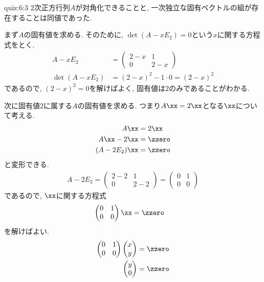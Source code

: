 \begin{answerof}{quiz:6:3}
  $2$次正方行列$A$が対角化できることと,
  一次独立な固有ベクトルの組が存在することは同値であった.

  まず$A$の固有値を求める.
  そのために, $\det(A-xE_2)=0$という$x$に関する方程式をとく.
  \begin{align*}
    A-xE_2&=\begin{pmatrix}2-x&1\\0&2-x\end{pmatrix}\\
    \det(A-xE_2)&=(2-x)^2-1\cdot 0=(2-x)^2
  \end{align*}
  であるので, $(2-x)^2=0$を解けばよく,
  固有値は$2$のみであることがわかる.

  次に固有値$2$に属する$A$の固有値を求める.
  つまり$A\xx=2\xx$となる$\xx$について考える.
  \begin{align*}
    A\xx&=2\xx\\
    A\xx-2\xx&=\zzero \\
    (A-2E_2)\xx&=\zzero
  \end{align*}
  と変形できる.
  \begin{align*}
    A-2E_2=\begin{pmatrix}2-2&1\\0&2-2\end{pmatrix}
    =\begin{pmatrix}0&1\\0&0\end{pmatrix}
  \end{align*}
  であるので, $\xx$に関する方程式
  \begin{align*}
    \begin{pmatrix}0&1\\0&0\end{pmatrix}\xx&=\zzero
  \end{align*}
  を解けばよい.
  \begin{align*}
    \begin{pmatrix}0&1\\0&0\end{pmatrix}
      \begin{pmatrix}x\\y\end{pmatrix}
      &=\zzero\\
      \begin{pmatrix}y\\0\end{pmatrix}
      &=\zzero\\
  \end{align*}

\end{answerof}
